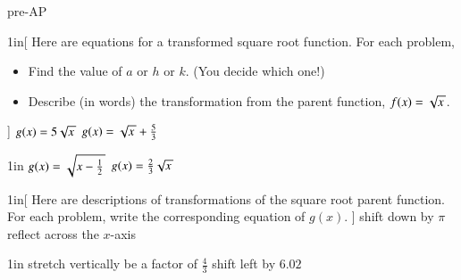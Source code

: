 \begin{taggedblock}{pre-AP}

\begin{my2Problems}[\normalsize]{1in}[%
    Here are equations for a transformed square root function.
    For each problem,
    \vspace{-1em}
    \begin{itemize}[nosep]
        \item Find the value of $a$ or $h$ or $k$. (You decide which one!)
        \item Describe (in words) the transformation from the parent function, $f(x)=\myRoot{x}$.
    \end{itemize}
    ]
    {
        $g(x) = 5 \myRoot{x}$
    }
    {
        $g(x) = \myRoot{x} + \frac{5}{3}$
    }
\end{my2Problems}
\begin{my2Problems}[\normalsize]{1in}
    {
        $g(x) = \myRoot{x-\frac{1}{2}}$
    }
    {
        $g(x) = \frac{2}{3}\myRoot{x}$
    }
\end{my2Problems}



\begin{my2Problems}[\normalsize]{1in}[%
    Here are descriptions of transformations of the square root parent function.
    For each problem, write the corresponding equation of $g(x)$.
    ]
    {
        shift down by $\pi$
    }
    {
        reflect across the $x$-axis
    }
\end{my2Problems}
\begin{my2Problems}[\normalsize]{1in}
    {
        stretch vertically be a factor of $\frac{4}{3}$
    }
    {
        shift left by $6.02$
    }
\end{my2Problems}


\end{taggedblock}

